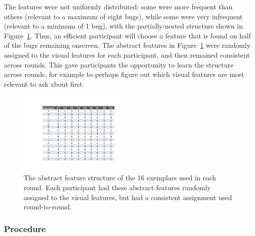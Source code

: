 \documentclass[10pt,letterpaper]{article}
\begin{document}
The features were not uniformly distributed: some were more frequent than others (relevant to a maximum of eight bugs), while some were very infrequent (relevant to a minimum of 1 bug), with the partially-nested structure shown in Figure~\ref{fig:feature_table}. Thus, an efficient participant will choose a feature that is found on half of the bugs remaining onscreen. The abstract features in Figure~\ref{fig:feature_table} were randomly assigned to the visual features for each participant, and then remained consistent across rounds. This gave participants the opportunity to learn the structure across rounds, for example to perhaps figure out which visual features are most relevant to ask about first.

\begin{figure}[h]
  \centering
  \includegraphics[width=0.48\textwidth]{figures/feature_table}
  \caption{The abstract feature structure of the 16 exemplars used in each round. Each participant had these abstract features randomly assigned to the visual features, but had a consistent assignment used round-to-round.}
  \label{fig:feature_table}
\end{figure} 

\subsubsection{Procedure}
\end{document}
